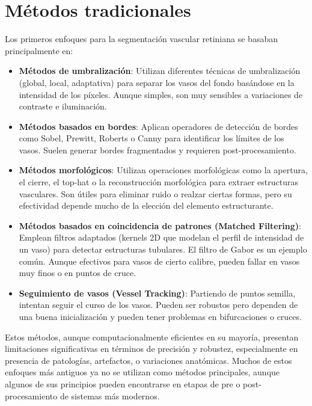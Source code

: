 \documentclass[11pt,a4paper]{report} %
\begin{document}
\section{Métodos tradicionales}
Los primeros enfoques para la segmentación vascular retiniana se basaban principalmente en:
\begin{itemize}
  \item \textbf{Métodos de umbralización}: Utilizan diferentes técnicas de umbralización (global, local, adaptativa) para separar los vasos del fondo basándose en la intensidad de los píxeles. Aunque simples, son muy sensibles a variaciones de contraste e iluminación.
  \item \textbf{Métodos basados en bordes}: Aplican operadores de detección de bordes como Sobel, Prewitt, Roberts o Canny para identificar los límites de los vasos. Suelen generar bordes fragmentados y requieren post-procesamiento.
  \item \textbf{Métodos morfológicos}: Utilizan operaciones morfológicas como la apertura, el cierre, el top-hat o la reconstrucción morfológica para extraer estructuras vasculares. Son útiles para eliminar ruido o realzar ciertas formas, pero su efectividad depende mucho de la elección del elemento estructurante.
  \item \textbf{Métodos basados en coincidencia de patrones (Matched Filtering)}: Emplean filtros adaptados (kernels 2D que modelan el perfil de intensidad de un vaso) para detectar estructuras tubulares. El filtro de Gabor es un ejemplo común. Aunque efectivos para vasos de cierto calibre, pueden fallar en vasos muy finos o en puntos de cruce.
  \item \textbf{Seguimiento de vasos (Vessel Tracking)}: Partiendo de puntos semilla, intentan seguir el curso de los vasos. Pueden ser robustos pero dependen de una buena inicialización y pueden tener problemas en bifurcaciones o cruces.
\end{itemize}
Estos métodos, aunque computacionalmente eficientes en su mayoría, presentan limitaciones significativas en términos de precisión y robustez, especialmente en presencia de patologías, artefactos, o variaciones anatómicas. Muchos de estos enfoques más antiguos ya no se utilizan como métodos principales, aunque algunos de sus principios pueden encontrarse en etapas de pre o post-procesamiento de sistemas más modernos.
\end{document}
